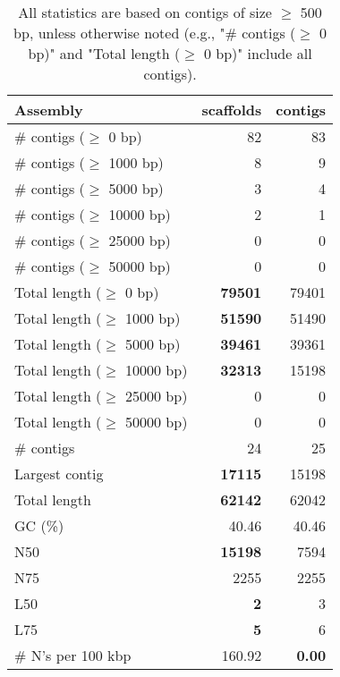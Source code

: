 \documentclass[12pt,a4paper]{article}
\begin{document}
\begin{table}[ht]
\begin{center}
\caption{All statistics are based on contigs of size $\geq$ 500 bp, unless otherwise noted (e.g., "\# contigs ($\geq$ 0 bp)" and "Total length ($\geq$ 0 bp)" include all contigs).}
\begin{tabular}{|l*{2}{|r}|}
\hline
Assembly & scaffolds & contigs \\ \hline
\# contigs ($\geq$ 0 bp) & 82 & 83 \\ \hline
\# contigs ($\geq$ 1000 bp) & 8 & 9 \\ \hline
\# contigs ($\geq$ 5000 bp) & 3 & 4 \\ \hline
\# contigs ($\geq$ 10000 bp) & 2 & 1 \\ \hline
\# contigs ($\geq$ 25000 bp) & 0 & 0 \\ \hline
\# contigs ($\geq$ 50000 bp) & 0 & 0 \\ \hline
Total length ($\geq$ 0 bp) & {\bf 79501} & 79401 \\ \hline
Total length ($\geq$ 1000 bp) & {\bf 51590} & 51490 \\ \hline
Total length ($\geq$ 5000 bp) & {\bf 39461} & 39361 \\ \hline
Total length ($\geq$ 10000 bp) & {\bf 32313} & 15198 \\ \hline
Total length ($\geq$ 25000 bp) & 0 & 0 \\ \hline
Total length ($\geq$ 50000 bp) & 0 & 0 \\ \hline
\# contigs & 24 & 25 \\ \hline
Largest contig & {\bf 17115} & 15198 \\ \hline
Total length & {\bf 62142} & 62042 \\ \hline
GC (\%) & 40.46 & 40.46 \\ \hline
N50 & {\bf 15198} & 7594 \\ \hline
N75 & 2255 & 2255 \\ \hline
L50 & {\bf 2} & 3 \\ \hline
L75 & {\bf 5} & 6 \\ \hline
\# N's per 100 kbp & 160.92 & {\bf 0.00} \\ \hline
\end{tabular}
\end{center}
\end{table}
\end{document}
